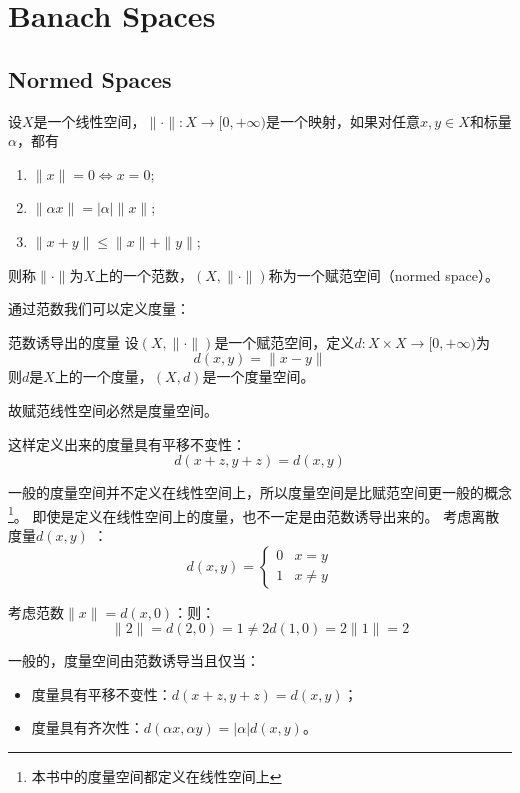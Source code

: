 \chapter{Banach Spaces}
\section{Normed Spaces}

\begin{definition}
    设$X$是一个线性空间，$\|\cdot\|:X\to [0,+\infty)$是一个映射，如果对任意$x,y\in X$和标量$\alpha$，都有
    \begin{enumerate}
        \item $\|x\|=0 \Leftrightarrow x=0$;
        \item $\|\alpha x\|=|\alpha|\|x\|$;
        \item $\|x+y\|\leq \|x\|+\|y\|$;
    \end{enumerate}
    则称$\|\cdot\|$为$X$上的一个范数，$(X,\|\cdot\|)$称为一个赋范空间（normed space）。
\end{definition}

通过范数我们可以定义度量：

\begin{definition}{范数诱导出的度量}
    设$(X,\|\cdot\|)$是一个赋范空间，定义$d:X\times X\to [0,+\infty)$为
    \[
        d(x,y)=\|x-y\|
    \]
    则$d$是$X$上的一个度量，$(X,d)$是一个度量空间。
\end{definition}

故赋范线性空间必然是度量空间。

这样定义出来的度量具有平移不变性：\[
    d(x+z,y+z)=d(x,y)
\]

一般的度量空间并不定义在线性空间上，所以度量空间是比赋范空间更一般的概念\footnote{本书中的度量空间都定义在线性空间上}。
即使是定义在线性空间上的度量，也不一定是由范数诱导出来的。
考虑离散度量\(d(x,y)\) ：
\[
    d(x,y)=
    \begin{cases}
        0 & x=y\\
        1 & x\neq y
    \end{cases}
\]

考虑范数\( \|x\| = d(x,0)\)：则：
\[
    \|2\| = d(2,0) = 1 \neq 2 d(1,0) = 2 \|1\|=2
\]

一般的，度量空间由范数诱导当且仅当：
\begin{itemize}
    \item 度量具有平移不变性：\(d(x+z,y+z)=d(x,y)\)；
    \item 度量具有齐次性：\(d(\alpha x, \alpha y) = |\alpha| d(x,y)\)。
\end{itemize}